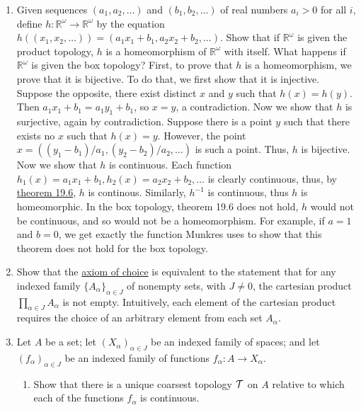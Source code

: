 \documentclass[12pt,letterpaper]{article}
\begin{document}
\begin{enumerate}
  \item Given sequences $(a_1, a_2, \dots)$ and $(b_1, b_2,\dots)$ of real numbers $a_i > 0$ for all $i$, define $h: \mathbb{R}^\omega \rightarrow \mathbb{R}^\omega$ by the equation $h((x_1, x_2, \dots)) = (a_1x_1+b_1, a_2x_2+b_2, \dots)$. Show that if $\mathbb{R}^\omega$ is given the product topology, $h$ is a homeomorphism of $\mathbb{R}^\omega$ with itself. What happens if $\mathbb{R}^\omega$ is given the box topology?\hspace{5in}\n
  \indent First, to prove that $h$ is a homeomorphism, we prove that it is bijective. To do that, we first show that it is injective. Suppose the opposite, there exist distinct $x$ and $y$ such that $h(x)=h(y)$. Then $a_1x_1+b_1 = a_1y_1 + b_1$, so $x=y$, a contradiction. Now we show that $h$ is surjective, again by contradiction. Suppose there is a point $y$ such that there exists no $x$ such that $h(x)=y$. However, the point $x=((y_1-b_1)/a_1, (y_2-b_2)/a_2, \dots)$ is such a point. Thus, $h$ is bijective. \hspace{5in}\n
  \indent Now we show that $h$ is continuous. Each function $h_1(x) = a_1x_1+b_1, h_2(x)=a_2x_2+b_2, \dots$ is clearly continuous, thus, by \hyperref[thm:MapsProducts19.6]{theorem 19.6}, $h$ is continous. Similarly, $h^{-1}$ is continuous, thus $h$ is homeomorphic.\hspace{5in}\n
  \indent In the box topology, theorem 19.6 does not hold, $h$ would not be continuous, and so would not be a homeomorphism. For example, if $a=1$ and $b=0$, we get exactly the function Munkres uses to show that this theorem does not hold for the box topology.
  \item Show that the \hyperref[thm:AxiomChoice]{axiom of choice} is equivalent to the statement that for any indexed family $\{A_\alpha\}_{\alpha\in J}$ of nonempty sets, with $J\neq 0$, the cartesian product $\prod_{\alpha\in J} A_\alpha$ is not empty.\n
  \indent Intuitively, each element of the cartesian product requires the choice of an arbitrary element from each set $A_\alpha$.
  \item Let $A$ be a set; let $(X_\alpha)_{\alpha\in J}$ be an indexed family of spaces; and let $(f_\alpha)_{\alpha\in J}$ be an indexed family of functions $f_\alpha: A \rightarrow X_\alpha$.
  \begin{enumerate}
    \item Show that there is a unique coarsest topology $\mathcal{T}$ on $A$ relative to which each of the functions $f_\alpha$ is continuous.\hspace{5in}\n

\end{enumerate}
\end{enumerate}
\end{document}
